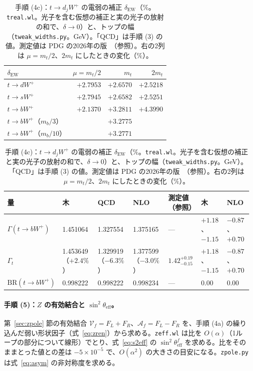 \documentclass[a4paper,10pt]{ltjsarticle}
\begin{document}
\begin{table}[tbp]
\centering\footnotesize\setlength{\tabcolsep}{4pt}
\caption{手順 (4c)：$t\to d_jW^+$ の電弱の補正 $\delta_{\mathrm{EW}}$（$\%$。\texttt{treal.wl}。光子を含む仮想の補正と実の光子の放射の和で、$\delta\to0$）と、トップの幅（\texttt{tweak\_widths.py}。GeV）。「QCD」は手順 (3) の値。測定値は PDG の2026年の版~\cite{pdg26t}（参照）。右の2列は $\mu=m_t/2$、$2m_t$ にしたときの変化（$\%$）。}
\label{tab:tweak}
\begin{tabular}{lrrr}
\toprule
$\delta_{\mathrm{EW}}$ & $\mu=m_t/2$ & $m_t$ & $2m_t$ \\
\midrule
$t\to dW^+$ & $+2.7953$ & $+2.6570$ & $+2.5218$ \\
$t\to sW^+$ & $+2.7945$ & $+2.6582$ & $+2.5251$ \\
$t\to bW^+$ & $+2.1370$ & $+3.2811$ & $+4.3990$ \\
$t\to bW^+$（$m_b/3$） & & $+3.2775$ & \\
$t\to bW^+$（$m_b/10$） & & $+3.2771$ & \\
\bottomrule
\end{tabular}

\medskip
\begin{tabular}{lllll|ll}
\toprule
量 & 木 & QCD & NLO & 測定値（参照） & 木 & NLO \\
\midrule
$\Gamma(t\to bW^+)$ & 1.451064 & 1.327554 & 1.375165 & — & $+1.18$、$-1.15$ & $-0.87$、$+0.70$ \\
$\Gamma_t$ & 1.453649（$+2.4\%$） & 1.329919（$-6.3\%$） & 1.377599（$-3.0\%$） & $1.42^{+0.19}_{-0.15}$ & $+1.18$、$-1.15$ & $-0.87$、$+0.70$ \\
$\mathrm{BR}(t\to bW^+)$ & 0.998222 & 0.998222 & 0.998234 & — & $0.00$ & $0.00$ \\
\bottomrule
\end{tabular}
\end{table}

\FloatBarrier
\paragraph{手順 (5)：$Z$ の有効結合と $\sin^2\theta_{\mathrm{eff}}$。}第~\ref{sec:zpole} 節の有効結合 $\mathcal V_f=F_L+F_R$、$\mathcal A_f=F_L-F_R$ を、手順 (4a) の繰り込んだ弱い形状因子（式~\eqref{eq:zren}）から求める。\texttt{zeff.wl} は比を $O(\alpha)$（1ループの部分について線形）でとり、式~\eqref{eq:s2eff} の $\sin^2\theta^f_{\mathrm{eff}}$ を求める。比をそのままとった値との差は $-5\times10^{-5}$ で、$O(\alpha^2)$ の大きさの目安になる。\texttt{zpole.py} は式~\eqref{eq:asym} の非対称度を求める。
\end{document}
